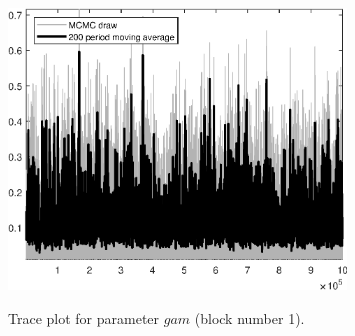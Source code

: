 \begin{figure}[H]
\centering
  \includegraphics[width=0.8\textwidth]{directed_search_est/graphs/TracePlot_gam_blck_1}\\
    \caption{Trace plot for parameter $gam$ (block number 1).}
\end{figure}
